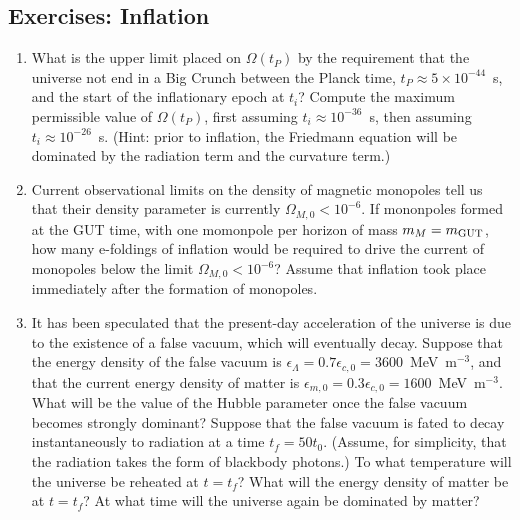 \documentclass{article}
\begin{document}
\subsection*{Exercises: Inflation}
\vspace {\baselineskip}
\begin{enumerate}
\item What is the upper limit placed on $\Omega(t_P)$ by the requirement that the universe not
end in a Big Crunch between the Planck time, $t_P\approx 5\times 10^{-44}$~s, and the start of 
the inflationary epoch at $t_i$? Compute the maximum permissible value of $\Omega(t_P)$, first
assuming $t_i\approx 10^{-36}$~s, then assuming $t_i\approx 10^{-26}$~s. (Hint: prior to 
inflation, the Friedmann equation will be dominated by the radiation term and the curvature 
term.)
\item Current observational limits on the density of magnetic monopoles tell us that their
density parameter is currently $\Omega_{M,0}<10^{-6}$. If mononpoles formed at the GUT time,
with one momonpole per horizon of mass $m_M=m_{\rm GUT}$, how many e-foldings of inflation
would be required to drive the current of monopoles below the limit $\Omega_{M,0}<10^{-6}$?
Assume that inflation took place immediately after the formation of monopoles.
\item It has been speculated that the present-day acceleration of the universe is due to the
existence of a false vacuum, which will eventually decay. Suppose that the energy density
of the false vacuum is $\epsilon_{\Lambda}=0.7\epsilon_{c,0}=3600$~MeV~m$^{-3}$, and that the
current energy density of matter is $\epsilon_{m,0}=0.3\epsilon_{c,0}=1600$~MeV~m$^{-3}$. What
will be the value of the Hubble parameter once the false vacuum becomes strongly dominant?
Suppose that the false vacuum is fated to decay instantaneously to radiation at a time 
$t_f=50t_0$. (Assume, for simplicity, that the radiation takes the form of blackbody photons.)
To what temperature will the universe be reheated at $t=t_f$? What will the energy density
of matter be at $t=t_f$? At what time will the universe again be dominated by matter?
\end{enumerate}
\end{document}
